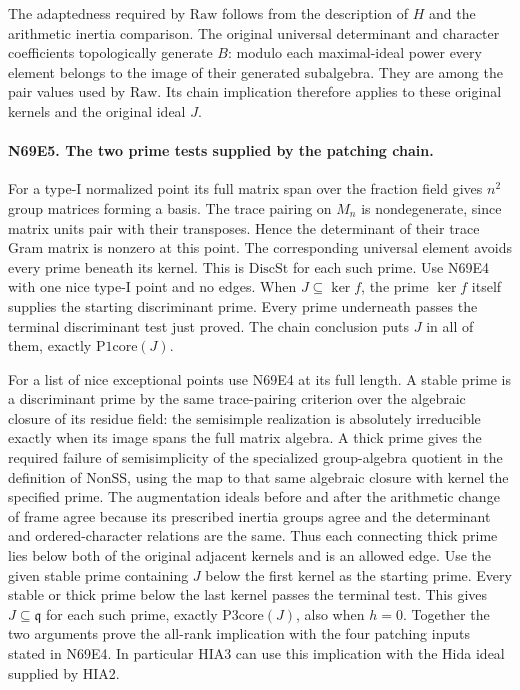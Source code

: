 The adaptedness required by $\mathrm{Raw}$ follows from the
description of $H$ and the arithmetic inertia comparison.
The original universal determinant and character coefficients
topologically generate $B$: modulo each maximal-ideal power every
element belongs to the image of their generated subalgebra.
They are among the pair values used by $\mathrm{Raw}$.
Its chain implication therefore applies to these original kernels
and the original ideal $J$.

\paragraph{N69E5. The two prime tests supplied by the patching chain.}
For a type-I normalized point its full matrix span over the
fraction field gives $n^2$ group matrices forming a basis.
The trace pairing on $M_n$ is nondegenerate, since matrix units
pair with their transposes. Hence the determinant of their trace
Gram matrix is nonzero at this point. The corresponding universal
element avoids every prime beneath its kernel. This is
$\mathrm{DiscSt}$ for each such prime. Use N69E4 with one nice
type-I point and no edges. When $J\subseteq\ker f$, the prime
$\ker f$ itself supplies the starting discriminant prime. Every
prime underneath passes the terminal discriminant test just proved.
The chain conclusion puts $J$ in all of them, exactly
$\mathrm{P1core}(J)$.

For a list of nice exceptional points use N69E4 at its full length.
A stable prime is a discriminant prime by the same trace-pairing
criterion over the algebraic closure of its residue field: the
semisimple realization is absolutely irreducible exactly when its
image spans the full matrix algebra. A thick prime gives the
required failure of semisimplicity of the specialized group-algebra
quotient in the definition of $\mathrm{NonSS}$, using the map to
that same algebraic closure with kernel the specified prime.
The augmentation ideals before and after the arithmetic change of
frame agree because its prescribed inertia groups agree and the
determinant and ordered-character relations are the same.
Thus each connecting thick prime lies below both of the original
adjacent kernels and is an allowed edge. Use the given stable
prime containing $J$ below the first kernel as the starting prime.
Every stable or thick prime below the last kernel passes the
terminal test. This gives $J\subseteq\mathfrak q$ for each such
prime, exactly $\mathrm{P3core}(J)$, also when $h=0$.
Together the two arguments prove the all-rank implication with the
four patching inputs stated in N69E4. In particular HIA3 can use
this implication with the Hida ideal supplied by HIA2.
